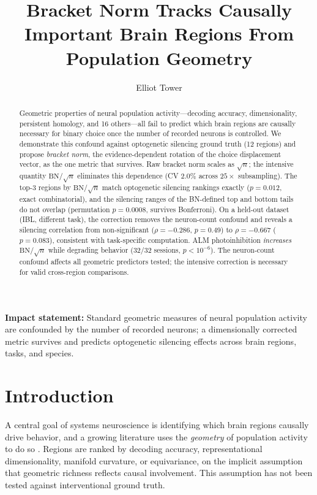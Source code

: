 \documentclass[9pt,lineno]{elife}
\title{Bracket Norm Tracks Causally Important Brain Regions From Population Geometry}
\author[1]{Elliot Tower}
\affil[1]{Independent Researcher}
\begin{document}
\maketitle

\begin{abstract}
Geometric properties of neural population activity---decoding accuracy, dimensionality, persistent homology, and 16 others---all fail to predict which brain regions are causally necessary for binary choice once the number of recorded neurons is controlled. We demonstrate this confound against optogenetic silencing ground truth (12 regions) and propose \emph{bracket norm}, the evidence-dependent rotation of the choice displacement vector, as the one metric that survives. Raw bracket norm scales as $\sqrt{n}$; the intensive quantity $\text{BN}/\!\sqrt{n}$ eliminates this dependence (CV $2.0\%$ across $25\times$ subsampling). The top-3 regions by $\text{BN}/\!\sqrt{n}$ match optogenetic silencing rankings exactly ($p = 0.012$, exact combinatorial), and the silencing ranges of the BN-defined top and bottom tails do not overlap (permutation $p = 0.0008$, survives Bonferroni). On a held-out dataset (IBL, different task), the correction removes the neuron-count confound and reveals a silencing correlation from non-significant ($\rho = -0.286$, $p = 0.49$) to $\rho = -0.667$ ($p = 0.083$), consistent with task-specific computation. ALM photoinhibition \emph{increases} $\text{BN}/\!\sqrt{n}$ while degrading behavior (32/32 sessions, $p < 10^{-6}$). The neuron-count confound affects all geometric predictors tested; the intensive correction is necessary for valid cross-region comparisons.
\end{abstract}

\noindent\textbf{Impact statement:} Standard geometric measures of neural population activity are confounded by the number of recorded neurons; a dimensionally corrected metric survives and predicts optogenetic silencing effects across brain regions, tasks, and species.

\section{Introduction}

A central goal of systems neuroscience is identifying which brain regions causally drive behavior, and a growing literature uses the \emph{geometry} of population activity to do so \citep{cunningham2014dimensionality, gallego2017neural}. Regions are ranked by decoding accuracy, representational dimensionality, manifold curvature, or equivariance, on the implicit assumption that geometric richness reflects causal involvement. This assumption has not been tested against interventional ground truth.
\end{document}
